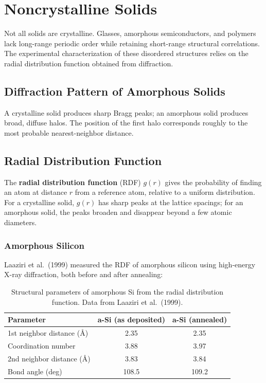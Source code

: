 \chapter{Noncrystalline Solids}

Not all solids are crystalline. Glasses, amorphous semiconductors, and polymers lack long-range periodic order while retaining short-range structural correlations. The experimental characterization of these disordered structures relies on the radial distribution function obtained from diffraction.

\section{Diffraction Pattern of Amorphous Solids}

A crystalline solid produces sharp Bragg peaks; an amorphous solid produces broad, diffuse halos. The position of the first halo corresponds roughly to the most probable nearest-neighbor distance.

\section{Radial Distribution Function}

The \textbf{radial distribution function} (RDF) $g(r)$ gives the probability of finding an atom at distance $r$ from a reference atom, relative to a uniform distribution. For a crystalline solid, $g(r)$ has sharp peaks at the lattice spacings; for an amorphous solid, the peaks broaden and disappear beyond a few atomic diameters.

\subsection{Amorphous Silicon}

Laaziri et al.\ (1999) measured the RDF of amorphous silicon using high-energy X-ray diffraction, both before and after annealing:

\begin{table}[H]
\centering
\caption{Structural parameters of amorphous Si from the radial distribution function. Data from Laaziri et al.\ (1999).}
\label{tab:asi}
\begin{tabular}{@{}lSS@{}}
\toprule
Parameter & {a-Si (as deposited)} & {a-Si (annealed)} \\
\midrule
1st neighbor distance (\AA{})     & 2.35 & 2.35 \\
Coordination number                         & 3.88 & 3.97 \\
2nd neighbor distance (\AA{})     & 3.83 & 3.84 \\
Bond angle (deg)                            & 108.5 & 109.2 \\
\bottomrule
\end{tabular}
\end{table}

